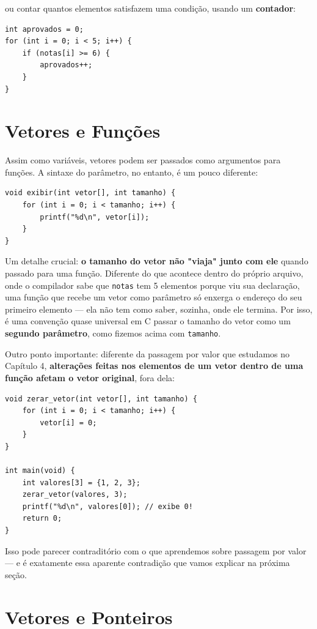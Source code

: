 ou contar quantos elementos satisfazem uma condição, usando um \textbf{contador}:

\begin{lstlisting}
int aprovados = 0;
for (int i = 0; i < 5; i++) {
    if (notas[i] >= 6) {
        aprovados++;
    }
}
\end{lstlisting}

\section{Vetores e Funções}
\label{sec:vetores-funcoes}

Assim como variáveis, vetores podem ser passados como argumentos para funções. A sintaxe do parâmetro, no entanto, é um pouco diferente:

\begin{lstlisting}
void exibir(int vetor[], int tamanho) {
    for (int i = 0; i < tamanho; i++) {
        printf("%d\n", vetor[i]);
    }
}
\end{lstlisting}

Um detalhe crucial: \textbf{o tamanho do vetor não "viaja" junto com ele} quando passado para uma função. Diferente do que acontece dentro do próprio arquivo, onde o compilador sabe que \texttt{notas} tem 5 elementos porque viu sua declaração, uma função que recebe um vetor como parâmetro só enxerga o endereço do seu primeiro elemento — ela não tem como saber, sozinha, onde ele termina. Por isso, é uma convenção quase universal em C passar o tamanho do vetor como um \textbf{segundo parâmetro}, como fizemos acima com \texttt{tamanho}.

Outro ponto importante: diferente da passagem por valor que estudamos no Capítulo 4, \textbf{alterações feitas nos elementos de um vetor dentro de uma função afetam o vetor original}, fora dela:

\begin{lstlisting}
void zerar_vetor(int vetor[], int tamanho) {
    for (int i = 0; i < tamanho; i++) {
        vetor[i] = 0;
    }
}

int main(void) {
    int valores[3] = {1, 2, 3};
    zerar_vetor(valores, 3);
    printf("%d\n", valores[0]); // exibe 0!
    return 0;
}
\end{lstlisting}

Isso pode parecer contraditório com o que aprendemos sobre passagem por valor — e é exatamente essa aparente contradição que vamos explicar na próxima seção.

\section{Vetores e Ponteiros}
\label{sec:vetores-ponteiros}

